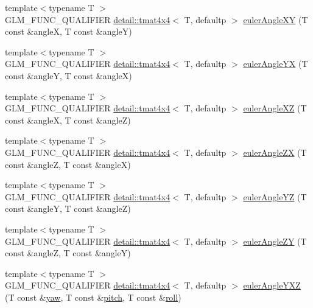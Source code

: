 \begin{DoxyCompactItemize}
\item 
{\footnotesize template$<$typename T $>$ }\\G\+L\+M\+\_\+\+F\+U\+N\+C\+\_\+\+Q\+U\+A\+L\+I\+F\+I\+ER \hyperlink{structglm_1_1detail_1_1tmat4x4}{detail\+::tmat4x4}$<$ T, defaultp $>$ \hyperlink{group__gtx__euler__angles_ga83a52d36fd752c92ce189197b51ea785}{euler\+Angle\+XY} (T const \&angleX, T const \&angleY)
\item 
{\footnotesize template$<$typename T $>$ }\\G\+L\+M\+\_\+\+F\+U\+N\+C\+\_\+\+Q\+U\+A\+L\+I\+F\+I\+ER \hyperlink{structglm_1_1detail_1_1tmat4x4}{detail\+::tmat4x4}$<$ T, defaultp $>$ \hyperlink{group__gtx__euler__angles_ga7599a8aaf3bf33b15517dd522a6d8020}{euler\+Angle\+YX} (T const \&angleY, T const \&angleX)
\item 
{\footnotesize template$<$typename T $>$ }\\G\+L\+M\+\_\+\+F\+U\+N\+C\+\_\+\+Q\+U\+A\+L\+I\+F\+I\+ER \hyperlink{structglm_1_1detail_1_1tmat4x4}{detail\+::tmat4x4}$<$ T, defaultp $>$ \hyperlink{group__gtx__euler__angles_ga61110cb520fbf21dd541cf4e25d81a65}{euler\+Angle\+XZ} (T const \&angleX, T const \&angleZ)
\item 
{\footnotesize template$<$typename T $>$ }\\G\+L\+M\+\_\+\+F\+U\+N\+C\+\_\+\+Q\+U\+A\+L\+I\+F\+I\+ER \hyperlink{structglm_1_1detail_1_1tmat4x4}{detail\+::tmat4x4}$<$ T, defaultp $>$ \hyperlink{group__gtx__euler__angles_ga5766bbe3f5b17b5c33ed21b2933ff278}{euler\+Angle\+ZX} (T const \&angleZ, T const \&angleX)
\item 
{\footnotesize template$<$typename T $>$ }\\G\+L\+M\+\_\+\+F\+U\+N\+C\+\_\+\+Q\+U\+A\+L\+I\+F\+I\+ER \hyperlink{structglm_1_1detail_1_1tmat4x4}{detail\+::tmat4x4}$<$ T, defaultp $>$ \hyperlink{group__gtx__euler__angles_ga4bff0f8324770261d3a6ddadd790ec22}{euler\+Angle\+YZ} (T const \&angleY, T const \&angleZ)
\item 
{\footnotesize template$<$typename T $>$ }\\G\+L\+M\+\_\+\+F\+U\+N\+C\+\_\+\+Q\+U\+A\+L\+I\+F\+I\+ER \hyperlink{structglm_1_1detail_1_1tmat4x4}{detail\+::tmat4x4}$<$ T, defaultp $>$ \hyperlink{group__gtx__euler__angles_gaeabd76319f5a19188a0423769950df76}{euler\+Angle\+ZY} (T const \&angleZ, T const \&angleY)
\item 
{\footnotesize template$<$typename T $>$ }\\G\+L\+M\+\_\+\+F\+U\+N\+C\+\_\+\+Q\+U\+A\+L\+I\+F\+I\+ER \hyperlink{structglm_1_1detail_1_1tmat4x4}{detail\+::tmat4x4}$<$ T, defaultp $>$ \hyperlink{group__gtx__euler__angles_gab9bc80f4f579efd8f0d161e8b58ff452}{euler\+Angle\+Y\+XZ} (T const \&\hyperlink{group__gtc__quaternion_ga1de7653ddf380ff06d2300eea831664c}{yaw}, T const \&\hyperlink{group__gtc__quaternion_ga4d345dc369a54f53f5ebc375bac56d11}{pitch}, T const \&\hyperlink{group__gtc__quaternion_ga6d883e423bc425f4334fcce202131f7e}{roll})

\end{DoxyCompactItemize}
